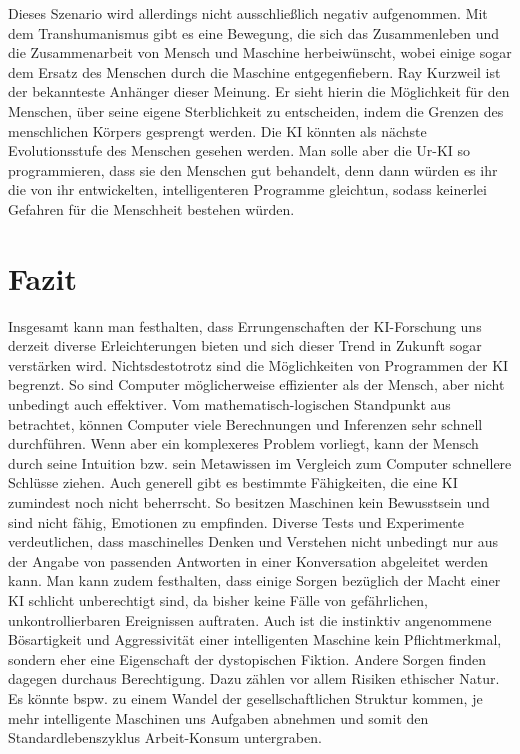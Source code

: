 Dieses Szenario wird allerdings nicht ausschließlich negativ aufgenommen.
Mit dem Transhumanismus gibt es eine Bewegung, die sich das Zusammenleben und die Zusammenarbeit von Mensch und Maschine herbeiwünscht, wobei einige sogar dem Ersatz des Menschen durch die Maschine entgegenfiebern.
Ray Kurzweil ist der bekannteste Anhänger dieser Meinung.
Er sieht hierin die Möglichkeit für den Menschen, über seine eigene Sterblichkeit zu entscheiden, indem die Grenzen des menschlichen Körpers gesprengt werden.
Die KI könnten als nächste Evolutionsstufe des Menschen gesehen werden.
Man solle aber die Ur-KI so programmieren, dass sie den Menschen gut behandelt, denn dann würden es ihr die von ihr entwickelten, intelligenteren Programme gleichtun, sodass keinerlei Gefahren für die Menschheit bestehen würden.

\section{Fazit}
Insgesamt kann man festhalten, dass Errungenschaften der KI-Forschung uns derzeit diverse Erleichterungen bieten und sich dieser Trend in Zukunft sogar verstärken wird.
Nichtsdestotrotz sind die Möglichkeiten von Programmen der KI begrenzt.
So sind Computer möglicherweise effizienter als der Mensch, aber nicht unbedingt auch effektiver.
Vom mathematisch-logischen Standpunkt aus betrachtet, können Computer viele Berechnungen und Inferenzen sehr schnell durchführen.
Wenn aber ein komplexeres Problem vorliegt, kann der Mensch durch seine Intuition bzw.
sein Metawissen im Vergleich zum Computer schnellere Schlüsse ziehen.
Auch generell gibt es bestimmte Fähigkeiten, die eine KI zumindest noch nicht beherrscht.
So besitzen Maschinen kein Bewusstsein und sind nicht fähig, Emotionen zu empfinden.
Diverse Tests und Experimente verdeutlichen, dass maschinelles Denken und Verstehen nicht unbedingt nur aus der Angabe von passenden Antworten in einer Konversation abgeleitet werden kann.
Man kann zudem festhalten, dass einige Sorgen bezüglich der Macht einer KI schlicht unberechtigt sind, da bisher keine Fälle von gefährlichen, unkontrollierbaren Ereignissen auftraten.
Auch ist die instinktiv angenommene Bösartigkeit und Aggressivität einer intelligenten Maschine kein Pflichtmerkmal, sondern eher eine Eigenschaft der dystopischen Fiktion.
Andere Sorgen finden dagegen durchaus Berechtigung.
Dazu zählen vor allem Risiken ethischer Natur.
Es könnte bspw.
zu einem Wandel der gesellschaftlichen Struktur kommen, je mehr intelligente Maschinen uns Aufgaben abnehmen und somit den Standardlebenszyklus Arbeit-Konsum untergraben.
